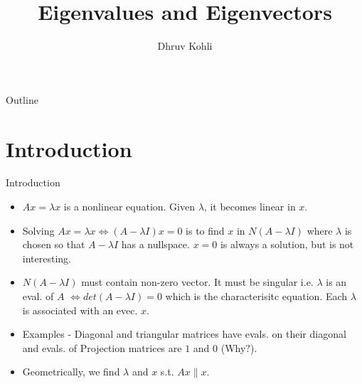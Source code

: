 \documentclass{beamer}
\title{Eigenvalues and Eigenvectors}
\author{Dhruv Kohli}
\institute[Indian Institute of Technology, Guwahati] %
{
  Department of Mathematics\\
  Indian Institute of Technology, Guwahati
}
\date{}
\begin{document}
\setlength{\abovedisplayskip}{1pt}
\setlength{\belowdisplayskip}{1pt}

\begin{frame}
  \titlepage
\end{frame}

\begin{frame}{Outline}
  \tableofcontents
\end{frame}

\begin{comment}
\section{Motivation}
\begin{frame}{Motivation}{}
  \begin{itemize}
  \item In mechanics, how to determine the principal directions of pure compression or tension with no shear?
  \end{itemize}
\end{frame}
\end{comment}

\section{Introduction}
\begin{frame}{Introduction}
\begin{itemize}
    \item $Ax = \lambda x$ is a nonlinear equation. Given $\lambda$, it becomes linear in $x$.
    \item Solving $Ax=\lambda x \iff (A-\lambda I)x = 0$ is to find $x$ in $N(A-\lambda I)$ where $\lambda$ is chosen so that $A-\lambda I$ has a nullspace. $x=0$ is always a solution, but is not interesting.
    \item $N(A-\lambda I)$ must contain non-zero vector. It must be singular i.e. $\lambda$ is an eval. of $A$ $\iff det(A-\lambda I) = 0$ which is the characterisitc equation. Each $\lambda$ is associated with an evec. $x$.
    \item Examples - Diagonal and triangular matrices have evals. on their diagonal and evals. of Projection matrices are $1$ and $0$ (Why$?$).
    \item Geometrically, we find $\lambda$ and $x$ s.t. $Ax \parallel x$.
\end{itemize}
\end{frame}
\end{document}

